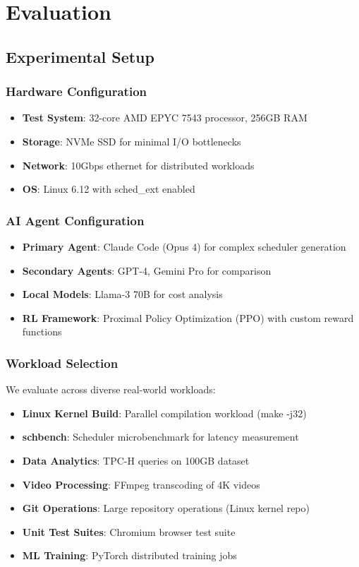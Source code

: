 \section{Evaluation}

\subsection{Experimental Setup}

\subsubsection{Hardware Configuration}
\begin{itemize}
\item \textbf{Test System}: 32-core AMD EPYC 7543 processor, 256GB RAM
\item \textbf{Storage}: NVMe SSD for minimal I/O bottlenecks
\item \textbf{Network}: 10Gbps ethernet for distributed workloads
\item \textbf{OS}: Linux 6.12 with sched\_ext enabled
\end{itemize}

\subsubsection{AI Agent Configuration}
\begin{itemize}
\item \textbf{Primary Agent}: Claude Code (Opus 4) for complex scheduler generation
\item \textbf{Secondary Agents}: GPT-4, Gemini Pro for comparison
\item \textbf{Local Models}: Llama-3 70B for cost analysis
\item \textbf{RL Framework}: Proximal Policy Optimization (PPO) with custom reward functions
\end{itemize}

\subsubsection{Workload Selection}
We evaluate across diverse real-world workloads:
\begin{itemize}
\item \textbf{Linux Kernel Build}: Parallel compilation workload (make -j32)
\item \textbf{schbench}: Scheduler microbenchmark for latency measurement
\item \textbf{Data Analytics}: TPC-H queries on 100GB dataset
\item \textbf{Video Processing}: FFmpeg transcoding of 4K videos
\item \textbf{Git Operations}: Large repository operations (Linux kernel repo)
\item \textbf{Unit Test Suites}: Chromium browser test suite
\item \textbf{ML Training}: PyTorch distributed training jobs
\end{itemize}


